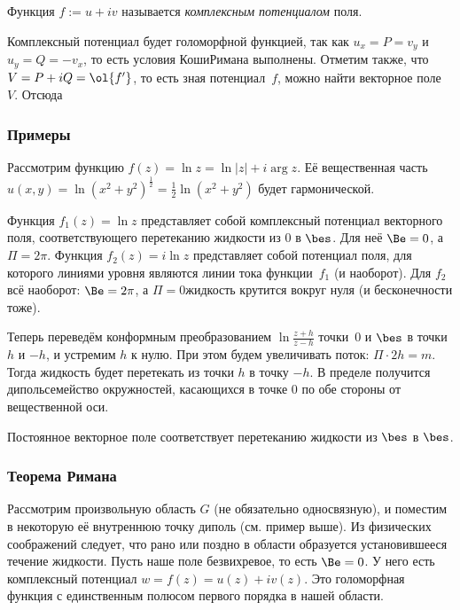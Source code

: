 \documentclass[a4paper]{article}
\begin{document}
\begin{df}
Функция $f := u + iv$ называется \emph{комплексным потенциалом} поля.
\end{df}

Комплексный потенциал будет голоморфной функцией, так как $u_x = P = v_y$ и $u_y = Q = -v_x$,
то есть условия Коши\ч Римана выполнены. Отметим также, что $V = P+iQ = \ol{f'}$, то есть
зная потенциал~$f$, можно найти векторное поле~$V$. Отсюда

\subsubsection{Примеры}

\begin{nums}{-2}
\item Рассмотрим функцию $f(z) = \ln z = \ln |z| + i \arg z$. Её вещественная часть
      $u(x,y)=\ln (x^2+y^2)^{\frac12} = \frac12\ln (x^2+y^2)$ будет гармонической.
\item Функция $f_1(z) = \ln z$ представляет собой комплексный потенциал
      векторного поля, соответствующего перетеканию жидкости из $0$ в $\bes$. Для
      неё $\Be = 0$, а $\Pi = 2\pi$. Функция $f_2(z) = i\ln z$ представляет собой
      потенциал поля, для которого линиями уровня являются линии тока функции~$f_1$
      (и наоборот). Для $f_2$ всё наоборот: $\Be=2\pi$, а $\Pi=0$\т жидкость
      крутится вокруг нуля (и бесконечности тоже).

      Теперь переведём конформным преобразованием $\ln \frac{z+h}{z-h}$ точки~$0$
      и $\bes$ в точки $h$ и $-h$, и устремим $h$ к нулю. При этом будем увеличивать
      поток: $\Pi \cdot 2h = m$. Тогда жидкость будет перетекать из точки $h$ в точку $-h$.
      В пределе получится диполь\т семейство окружностей, касающихся в точке $0$ по
      обе стороны от вещественной оси.
\item Постоянное векторное поле соответствует перетеканию жидкости из $\bes$ в $\bes$.
\end{nums}

\subsubsection{Теорема Римана}

Рассмотрим произвольную область $G$ (не обязательно односвязную), и поместим в некоторую
её внутреннюю точку диполь (см. пример выше). Из физических соображений следует, что рано
или поздно в области образуется установившееся течение жидкости. Пусть наше поле безвихревое,
то есть $\Be=0$. У него есть комплексный потенциал $w=f(z)=u(z)+iv(z)$. Это голоморфная
функция с единственным полюсом первого порядка в нашей области.
\end{document}
